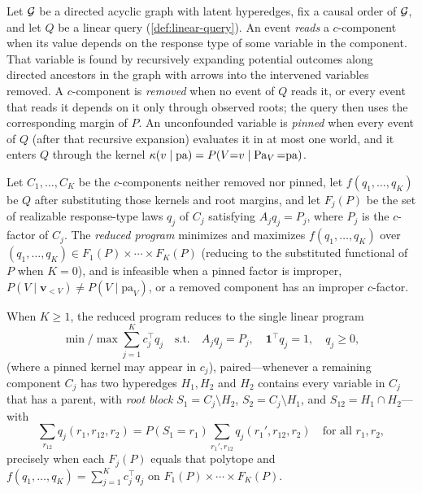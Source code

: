 \begin{definition}
  \label{def:reduced}
  Let $\mathcal{G}$ be a directed acyclic graph with latent hyperedges, fix a causal order of $\mathcal{G}$, and let $Q$ be a linear query (\cref{def:linear-query}). An event \emph{reads} a $c$-component when its value depends on the response type of some variable in the component. That variable is found by recursively expanding potential outcomes along directed ancestors in the graph with arrows into the intervened variables removed. A $c$-component is \emph{removed} when no event of $Q$ reads it, or every event that reads it depends on it only through observed roots; the query then uses the corresponding margin of $P$. An unconfounded variable is \emph{pinned} when every event of $Q$ (after that recursive expansion) evaluates it in at most one world, and it enters $Q$ through the kernel $\kappa(v\mid\mathrm{pa})=P(V{=}v\mid\operatorname{Pa}_V{=}\mathrm{pa})$.

  Let $C_1,\ldots,C_K$ be the $c$-components neither removed nor pinned, let $f(q_1,\ldots,q_K)$ be $Q$ after substituting those kernels and root margins, and let $F_j(P)$ be the set of realizable response-type laws $q_j$ of $C_j$ satisfying $A_j q_j=P_j$, where $P_j$ is the $c$-factor of $C_j$. The \emph{reduced program} minimizes and maximizes $f(q_1,\ldots,q_K)$ over $(q_1,\ldots,q_K)\in F_1(P)\times\cdots\times F_K(P)$ (reducing to the substituted functional of $P$ when $K=0$), and is infeasible when a pinned factor is improper, $P(V\mid\mathbf{v}_{<V})\neq P(V\mid\mathrm{pa}_V)$, or a removed component has an improper $c$-factor.

  When $K\ge 1$, the reduced program reduces to the single linear program
  \begin{equation}
  \label{eq:lp}
  \min/\max\sum_{j=1}^{K} c_j^\top q_j
  \quad\text{s.t.}\quad
  A_j q_j = P_j,\quad \mathbf{1}^\top q_j=1,\quad q_j\ge 0,
  \end{equation}
  (where a pinned kernel may appear in $c_j$), paired—whenever a remaining component $C_j$ has two hyperedges $H_1,H_2$ and $H_2$ contains every variable in $C_j$ that has a parent, with \emph{root block} $S_1=C_j\setminus H_2$, $S_2=C_j\setminus H_1$, and $S_{12}=H_1\cap H_2$—with
  \begin{equation}
  \label{eq:two}
  \sum_{r_{12}}q_j(r_1,r_{12},r_2)
  =
  P(S_1{=}r_1)\sum_{r_1',r_{12}}q_j(r_1',r_{12},r_2)
  \quad\text{for all }r_1,r_2,
  \end{equation}
  precisely when each $F_j(P)$ equals that polytope and $f(q_1,\ldots,q_K)=\sum_{j=1}^K c_j^\top q_j$ on $F_1(P)\times\cdots\times F_K(P)$.
\end{definition}

